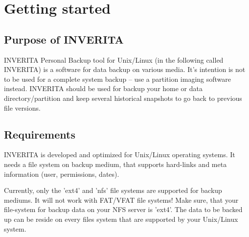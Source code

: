 %
%
%
%


\chapter{Getting started}

\section{Purpose of INVERITA}
INVERITA Personal Backup tool for Unix/Linux (in the following called INVERITA)
is a software for data backup on various media. It's intention is not to be
used for a complete system backup -- use a partition imaging software instead.
INVERITA should be used for backup your home or data directory/partition
and keep several historical snapshots to go back to previous file versions.

\section{Requirements}
INVERITA is developed and optimized for Unix/Linux operating systems. It needs a file
system on backup medium, that supports hard-links and meta information (user, permissions, dates).

\begin{warning}
Currently, only the 'ext4' and 'nfs' file systems are supported for backup mediums.
It will not work with FAT/VFAT file systems!
Make sure, that your file-system for backup data on your NFS server is 'ext4'.
The data to be backed up can be reside on every files system that are supported
by your Unix/Linux system.
\end{warning}

